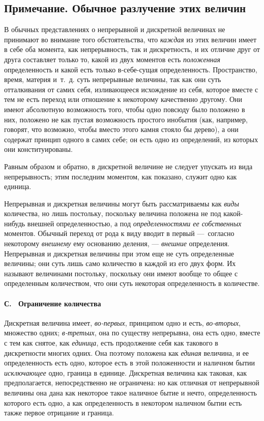 \subsection*{Примечание. Обычное разлучение этих величин}

В обычных представлениях о непрерывной и дискретной величинах не принимают
во внимание того обстоятельства, что {\em каждая} из
этих величин имеет в себе оба момента, как непрерывность, так и
дискретность, и их отличие друг от друга составляет только то, какой из
двух моментов есть {\em положенная} определенность и
какой есть только в-себе-сущая определенность. Пространство, время, материя
и~т.~д. суть непрерывные величины, так как они суть отталкивания от самих
себя, изливающееся исхождение из себя, которое вместе с тем не есть переход
или отношение к некоторому качественно другому. Они имеют абсолютную
возможность того, чтобы одно повсюду было положено в них, положено не как
пустая возможность простого инобытия (как, например, говорят, что возможно,
чтобы вместо этого камня стояло бы дерево), а они содержат принцип одного в
самих себе; он есть одно из определений, из которых они конституированы.

Равным образом и обратно, в дискретной величине не следует упускать из вида
непрерывность; этим последним моментом, как показано, служит одно как
единица.

Непрерывная и дискретная величины могут быть рассматриваемы как
{\em виды} количества, но лишь постольку, поскольку
величина положена не под какой-нибудь внешней определенностью, а под
{\em определенностями ее собственных} моментов. Обычный
переход от рода к виду вводит в первый —~согласно некоторому
{\em внешнему} ему основанию деления, —
{\em внешние} определения. Непрерывная и дискретная
величины при этом еще не суть определенные величины; они суть лишь само
количество в каждой из его двух форм. Их называют величинами постольку,
поскольку они имеют вообще то общее с определенным количеством, что они
суть некоторая определенность в количестве.

\paragraph[С. \ Ограничение количества]{С. \ Ограничение количества}
Дискретная величина имеет, {\em во-первых}, принципом
одно и есть, {\em во-вторых}, множество одних;
{\em в-третьих}, она по существу непрерывна, она есть
одно, вместе с тем как снятое, как {\em единица}, есть
продолжение себя как такового в дискретности многих одних. Она поэтому
положена как {\em единая} величина, и ее определенность
есть одно, которое есть в этой положенности и наличном бытии
{\em исключающее} одно, граница в единице. Дискретная
величина как таковая, как предполагается, непосредственно не ограничена: но
как отличная от непрерывной величины она дана как некоторое такое наличное
бытие и нечто, определенность которого есть одно, а как определенность в
некотором наличном бытии есть также первое отрицание и граница.


